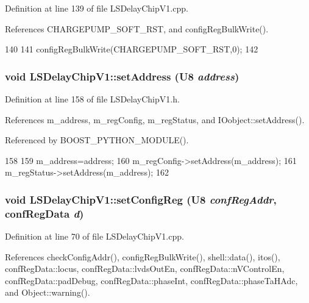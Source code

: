 Definition at line 139 of file LSDelayChipV1.cpp.

References CHARGEPUMP\_\-SOFT\_\-RST, and configRegBulkWrite().


\begin{DoxyCode}
140 {
141     configRegBulkWrite(CHARGEPUMP_SOFT_RST,0);
142 }
\end{DoxyCode}
\hypertarget{classLSDelayChipV1_a04ec44c79258fd22f7d2d5ea27a67648}{
\subsubsection[{setAddress}]{\setlength{\rightskip}{0pt plus 5cm}void LSDelayChipV1::setAddress ({\bf U8} {\em address})}}
\label{classLSDelayChipV1_a04ec44c79258fd22f7d2d5ea27a67648}


Definition at line 158 of file LSDelayChipV1.h.

References m\_\-address, m\_\-regConfig, m\_\-regStatus, and IOobject::setAddress().

Referenced by BOOST\_\-PYTHON\_\-MODULE().


\begin{DoxyCode}
158                              {
159     m_address=address;
160     m_regConfig->setAddress(m_address);
161     m_regStatus->setAddress(m_address);
162   }
\end{DoxyCode}
\hypertarget{classLSDelayChipV1_a11fa2ebfa37c5cf0544ddb68c7d43e94}{
\subsubsection[{setConfigReg}]{\setlength{\rightskip}{0pt plus 5cm}void LSDelayChipV1::setConfigReg ({\bf U8} {\em confRegAddr}, \/  {\bf confRegData} {\em d})}}
\label{classLSDelayChipV1_a11fa2ebfa37c5cf0544ddb68c7d43e94}


Definition at line 70 of file LSDelayChipV1.cpp.

References checkConfigAddr(), configRegBulkWrite(), shell::data(), itos(), confRegData::locus, confRegData::lvdsOutEn, confRegData::nVControlEn, confRegData::padDebug, confRegData::phaseInt, confRegData::phaseTaHAdc, and Object::warning().

